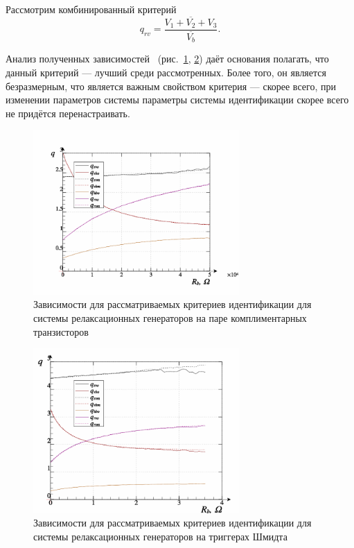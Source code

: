 Рассмотрим комбинированный критерий
\begin{equation}
  q_{rv} = \frac{\overline{V_1+V_2+V_3}}{\overline{V_b}}.
  \label{atu:eq:q_rv_relax}
\end{equation}


Анализ полученных зависимостей ~(рис.~\ref{atu:f:relax3d_q}, \ref{atu:f:relax3ds_q})
даёт основания полагать, что данный критерий --- лучший среди рассмотренных.
Более того, он является безразмерным, что является важным свойством критерия ---
скорее всего, при изменении параметров системы параметры системы
идентификации скорее всего не придётся перенастраивать.

\begin{figure}[htb!]
  \centerline{\includegraphics[width=0.7\textwidth]{p/relax3d_read_q-p_q1.png} }
  \caption{Зависимости для рассматриваемых критериев идентификации для системы релаксационных генераторов на паре комплиментарных транзисторов}
  \label{atu:f:relax3d_q}
\end{figure}

\begin{figure}[htb!]
  \centerline{\includegraphics[width=0.7\textwidth]{p/relax3ds_read_q-p_q1.png} }
  \caption{Зависимости для рассматриваемых критериев идентификации для системы релаксационных генераторов на триггерах Шмидта}
  \label{atu:f:relax3ds_q}
\end{figure}


